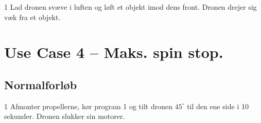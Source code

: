 \documentclass[Main]{subfiles}
\begin{document}
\begin{TestCaseIntro}
\end{TestCaseIntro}

\begin{TestCase}
\TC
{1}
{Lad dronen svæve i luften og løft et objekt imod dens front.}
{Dronen drejer sig væk fra et objekt.}

\end{TestCase}






\newpage
\section{Use Case 4 -- Maks. spin stop.}
\subsection*{Normalforløb}

\begin{TestCaseIntro}
\end{TestCaseIntro}

\begin{TestCase}
\TC
{1}
{Afmonter propellerne, kør program 1 og tilt dronen $45^\circ$ til den ene side i 10 sekunder.}
{Dronen slukker sin motorer.}
{}
\end{TestCase}
\end{document}
